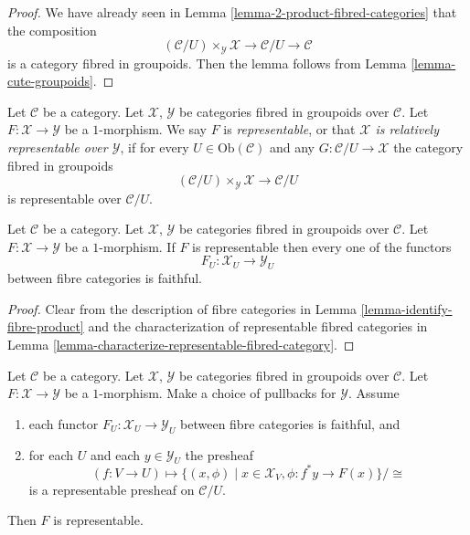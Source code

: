 \begin{proof}
We have already seen in Lemma \ref{lemma-2-product-fibred-categories}
that the composition
$$
(\mathcal{C}/U) \times_{\mathcal{Y}} \mathcal{X}
\longrightarrow
\mathcal{C}/U
\longrightarrow
\mathcal{C}
$$
is a category fibred in groupoids. Then the lemma follows from
Lemma \ref{lemma-cute-groupoids}.
\end{proof}

\begin{definition}
\label{definition-representable-map-categories-fibred-in-groupoids}
Let $\mathcal{C}$ be a category.
Let $\mathcal{X}$, $\mathcal{Y}$ be categories fibred in groupoids
over $\mathcal{C}$.
Let $F : \mathcal{X} \to \mathcal{Y}$ be a $1$-morphism.
We say $F$ is {\it representable}, or that
{\it $\mathcal{X}$ is relatively representable over $\mathcal{Y}$},
if for every $U \in \text{Ob}(\mathcal{C})$
and any $G : \mathcal{C}/U \to \mathcal{X}$
the category fibred in groupoids
$$
(\mathcal{C}/U) \times_{\mathcal{Y}} \mathcal{X}
\longrightarrow
\mathcal{C}/U
$$
is representable over $\mathcal{C}/U$.
\end{definition}

\begin{lemma}
\label{lemma-spell-out-representable-map-stack-in-groupoids}
Let $\mathcal{C}$ be a category.
Let $\mathcal{X}$, $\mathcal{Y}$ be categories fibred in groupoids
over $\mathcal{C}$.
Let $F : \mathcal{X} \to \mathcal{Y}$ be a $1$-morphism.
If $F$ is representable then every one of the functors
$$
F_U : \mathcal{X}_U \longrightarrow \mathcal{Y}_U
$$
between fibre categories is faithful.
\end{lemma}

\begin{proof}
Clear from the description of fibre categories in
Lemma \ref{lemma-identify-fibre-product} and the characterization
of representable fibred categories in
Lemma \ref{lemma-characterize-representable-fibred-category}.
\end{proof}

\begin{lemma}
\label{lemma-criterion-representable-map-stack-in-groupoids}
Let $\mathcal{C}$ be a category.
Let $\mathcal{X}$, $\mathcal{Y}$ be categories fibred in groupoids
over $\mathcal{C}$.
Let $F : \mathcal{X} \to \mathcal{Y}$ be a $1$-morphism.
Make a choice of pullbacks for $\mathcal{Y}$.
Assume
\begin{enumerate}
\item each functor $F_U : \mathcal{X}_U \longrightarrow \mathcal{Y}_U$
between fibre categories is faithful, and
\item for each $U$ and each $y \in \mathcal{Y}_U$ the presheaf
$$
(f : V \to U)
\longmapsto
\{(x, \phi) \mid x \in \mathcal{X}_V, \phi : f^*y \to F(x)\}/\cong
$$
is a representable presheaf on $\mathcal{C}/U$.
\end{enumerate}
Then $F$ is representable.
\end{lemma}

